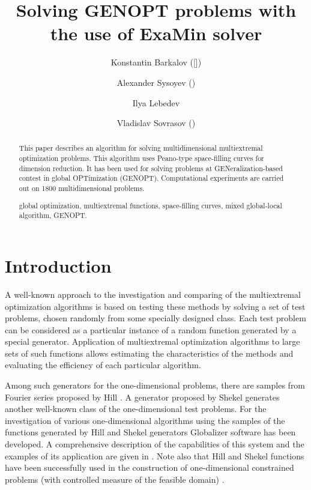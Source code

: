 \documentclass{llncs}
\begin{document}
\mainmatter 

\title{Solving GENOPT problems \newline with the use of ExaMin solver}
\author{Konstantin Barkalov ([\Letter]) \and Alexander Sysoyev ()  \and Ilya Lebedev  \and Vladislav Sovrasov () }




\maketitle

\begin{abstract}

This paper describes an algorithm for solving multidimensional multiextremal optimization problems. This algorithm uses Peano-type space-filling curves for dimension reduction. It has been used for solving problems at GENeralization-based
contest in global OPTimization (GENOPT). Computational experiments are carried out on 1800 multidimensional problems.

\keywords global optimization, multiextremal functions, space-filling curves, mixed global-local algorithm, GENOPT.

\end{abstract}

\section{Introduction}
A well-known approach to the investigation and comparing of the multiextremal optimization algorithms is based on testing these methods by solving a set of test problems, chosen randomly from some specially designed class. Each test problem can be considered as a particular instance of a random function generated by a special generator. Application of multiextremal optimization algorithms to large sets of such functions allows estimating the characteristics of the methods and evaluating the efficiency of each particular algorithm.

Among such generators for the one-dimensional problems, there are samples from Fourier series proposed by Hill \cite{Hill}. A generator proposed by Shekel \cite{Shekel} generates another well-known class of the one-dimensional test problems. For the investigation of various one-dimensional algorithms using the samples of the functions generated by Hill and Shekel generators Globalizer software has been developed. A comprehensive description of the capabilities of this system and the examples of its application are given in \cite{Strongin2000}. Note also that Hill and Shekel functions have been successfully used in the construction of one-dimensional constrained problems (with controlled measure of the feasible domain) \cite{Barkalov2002}. 
\end{document}
